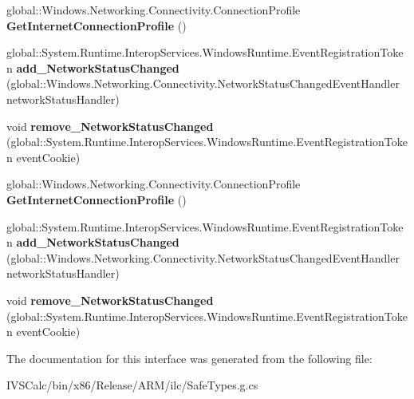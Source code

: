 \begin{DoxyCompactItemize}
\item 
\mbox{\label{interface_windows_1_1_networking_1_1_connectivity_1_1_i_network_information_statics_ad3ef05f2aa0e8eba2f3ec17040f38ea0}} 
global\+::\+Windows.\+Networking.\+Connectivity.\+Connection\+Profile {\bfseries Get\+Internet\+Connection\+Profile} ()
\item 
\mbox{\label{interface_windows_1_1_networking_1_1_connectivity_1_1_i_network_information_statics_a4a3e3682f51b9045eb6cda230e158f1f}} 
global\+::\+System.\+Runtime.\+Interop\+Services.\+Windows\+Runtime.\+Event\+Registration\+Token {\bfseries add\+\_\+\+Network\+Status\+Changed} (global\+::\+Windows.\+Networking.\+Connectivity.\+Network\+Status\+Changed\+Event\+Handler network\+Status\+Handler)
\item 
\mbox{\label{interface_windows_1_1_networking_1_1_connectivity_1_1_i_network_information_statics_a02ae9ff4dce202e50a3853e7bf5adbaa}} 
void {\bfseries remove\+\_\+\+Network\+Status\+Changed} (global\+::\+System.\+Runtime.\+Interop\+Services.\+Windows\+Runtime.\+Event\+Registration\+Token event\+Cookie)
\item 
\mbox{\label{interface_windows_1_1_networking_1_1_connectivity_1_1_i_network_information_statics_ad3ef05f2aa0e8eba2f3ec17040f38ea0}} 
global\+::\+Windows.\+Networking.\+Connectivity.\+Connection\+Profile {\bfseries Get\+Internet\+Connection\+Profile} ()
\item 
\mbox{\label{interface_windows_1_1_networking_1_1_connectivity_1_1_i_network_information_statics_a4a3e3682f51b9045eb6cda230e158f1f}} 
global\+::\+System.\+Runtime.\+Interop\+Services.\+Windows\+Runtime.\+Event\+Registration\+Token {\bfseries add\+\_\+\+Network\+Status\+Changed} (global\+::\+Windows.\+Networking.\+Connectivity.\+Network\+Status\+Changed\+Event\+Handler network\+Status\+Handler)
\item 
\mbox{\label{interface_windows_1_1_networking_1_1_connectivity_1_1_i_network_information_statics_a02ae9ff4dce202e50a3853e7bf5adbaa}} 
void {\bfseries remove\+\_\+\+Network\+Status\+Changed} (global\+::\+System.\+Runtime.\+Interop\+Services.\+Windows\+Runtime.\+Event\+Registration\+Token event\+Cookie)
\end{DoxyCompactItemize}


The documentation for this interface was generated from the following file\+:\begin{DoxyCompactItemize}
\item 
I\+V\+S\+Calc/bin/x86/\+Release/\+A\+R\+M/ilc/Safe\+Types.\+g.\+cs\end{DoxyCompactItemize}
